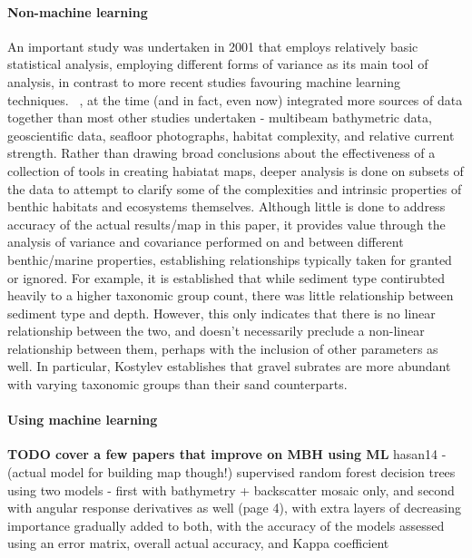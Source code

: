 \documentclass[12pt]{article}
\begin{document}
            \paragraph {Non-machine learning} An important study was undertaken in 2001 that employs relatively basic statistical analysis, employing different forms of variance as its main tool of analysis, in contrast to more recent studies favouring machine learning techniques. ~\citep*{kostylev01}, at the time (and in fact, even now) integrated more sources of data together than most other studies undertaken - multibeam bathymetric data, geoscientific data, seafloor photographs, habitat complexity, and relative current strength. Rather than drawing broad conclusions about the effectiveness of a collection of tools in creating habiatat maps, deeper analysis is done on subsets of the data to attempt to clarify some of the complexities and intrinsic properties of benthic habitats and ecosystems themselves. Although little is done to address accuracy of the actual results/map in this paper, it provides value through the analysis of variance and covariance performed on and between different benthic/marine properties, establishing relationships typically taken for granted or ignored. For example, it is established that while sediment type contirubted heavily to a higher taxonomic group count, there was little relationship between sediment type and depth. However, this only indicates that there is no linear relationship between the two, and doesn't necessarily preclude a non-linear relationship between them, perhaps with the inclusion of other parameters as well. In particular, Kostylev establishes that gravel subrates are more abundant with varying taxonomic groups than their sand counterparts.

            \paragraph {Using machine learning}
            \textbf{TODO cover a few papers that improve on MBH using ML}
            hasan14 - (actual model for building map though!) supervised random forest decision trees using two models - first with bathymetry + backscatter mosaic only, and second with angular response derivatives as well (page 4), with extra layers of decreasing importance gradually added to both, with the accuracy of the models assessed using an error matrix, overall actual accuracy, and Kappa coefficient ~\citep*{hasan14}

\end{document}
